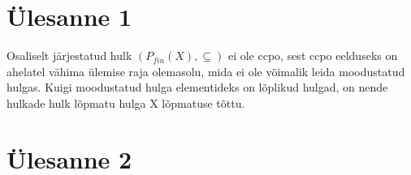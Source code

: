\section{Ülesanne 1}

Osaliselt järjestatud hulk \( (P_{fin}(X), \subseteq) \) ei ole ccpo, sest ccpo
eelduseks on ahelatel vähima ülemise raja olemasolu, mida ei ole võimalik leida
moodustatud hulgas. Kuigi moodustatud hulga elementideks on lõplikud hulgad, on
nende hulkade hulk lõpmatu hulga X lõpmatuse tõttu.

\section{Ülesanne 2}



